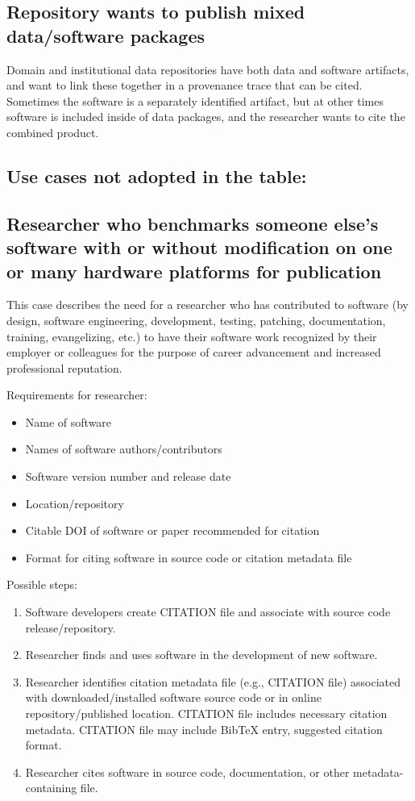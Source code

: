 \documentclass[12pt, oneside]{amsart}
\begin{document}
\subsection{Repository wants to publish mixed data\slash software packages}

Domain and institutional data repositories have both data and software
artifacts, and want to link these together in a provenance trace that can
be cited. Sometimes the software is a separately identified artifact, but at
other times software is included inside of data packages, and the researcher
wants to cite the combined product.

\subsection*{Use cases not adopted in the table:}

\subsection*{Researcher who benchmarks someone else's software with or without modification on one or many hardware platforms for publication}

This case describes the need for a researcher who has contributed to software (by design, software engineering, development, testing, patching, documentation, training, evangelizing, etc.) to have their software work recognized by their employer or colleagues for the purpose of career advancement and increased professional reputation.

Requirements for researcher:
\begin{itemize}
\item Name of software
\item Names of software authors/contributors
\item Software version number and release date
\item Location/repository
\item Citable DOI of software or paper recommended for citation
\item Format for citing software in source code or citation metadata file
\end{itemize}

Possible steps:
\begin{enumerate} \setcounter{enumi}{0}
\item Software developers create CITATION file and associate with source code release/repository.
\item Researcher finds and uses software in the development of new software.
\item Researcher identifies citation metadata file (e.g., CITATION file) associated with downloaded/installed software source code or in online repository/published location. CITATION file includes necessary citation metadata. CITATION file may include BibTeX entry, suggested citation format.
\item Researcher cites software in source code, documentation, or other metadata-containing file.
\end{enumerate}
\end{document}
